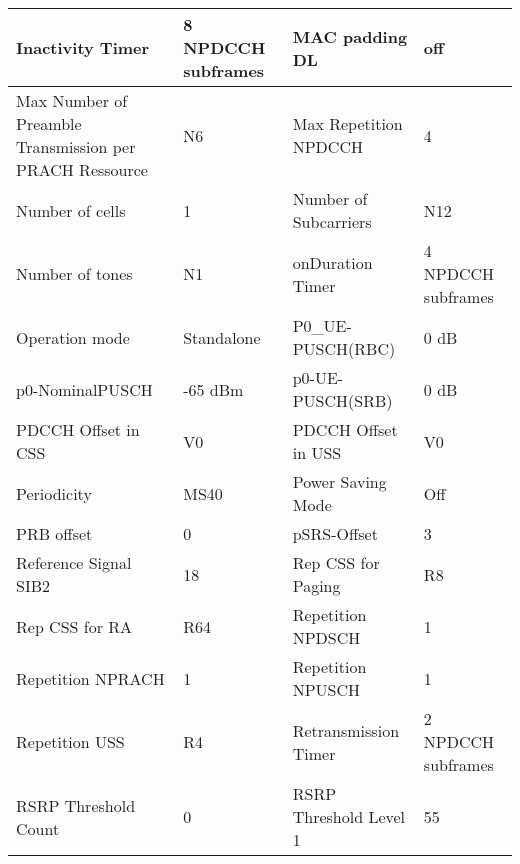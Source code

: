\begin{longtable}{|*4{p{3cm}|}}
Inactivity Timer                                        & 8 NPDCCH subframes & MAC padding DL                            & off                \\ \hline
Max Number of Preamble Transmission per PRACH Ressource & N6                 & Max Repetition NPDCCH                     & 4                  \\ \hline
Number of cells                                         & 1                  & Number of Subcarriers                     & N12                \\ \hline
Number of tones                                         & N1                 & onDuration Timer                          & 4 NPDCCH subframes \\ \hline
Operation mode                                          & Standalone         & P0\_UE-PUSCH(RBC)                         & 0 dB               \\ \hline
p0-NominalPUSCH                                         & -65 dBm            & p0-UE-PUSCH(SRB)                          & 0 dB               \\ \hline
PDCCH Offset in CSS                                     & V0                 & PDCCH Offset in USS                       & V0                 \\ \hline
Periodicity                                             & MS40               & Power Saving Mode                         & Off                \\ \hline
PRB offset                                              & 0                  & pSRS-Offset                               & 3                  \\ \hline
Reference Signal SIB2                                   & 18                 & Rep CSS for Paging                        & R8                 \\ \hline
Rep CSS for RA                                          & R64                & Repetition NPDSCH                         & 1                  \\ \hline
Repetition NPRACH                                       & 1                  & Repetition NPUSCH                         & 1                  \\ \hline
Repetition USS                                          & R4                 & Retransmission Timer                      & 2 NPDCCH subframes \\ \hline
RSRP Threshold Count                                    & 0                  & RSRP Threshold Level 1                    & 55                 \\ \hline

\end{longtable}
